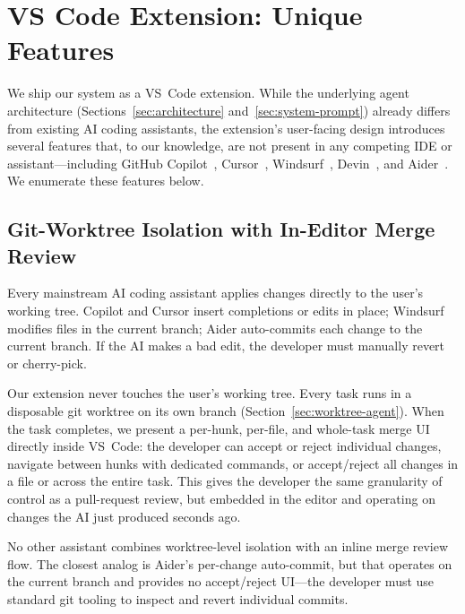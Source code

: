 \documentclass{article}
\begin{document}
\section{VS Code Extension: Unique Features}
\label{sec:vscode-features}

We ship our system as a VS~Code extension.  While
the underlying agent architecture (Sections~\ref{sec:architecture}
and~\ref{sec:system-prompt}) already differs from existing AI coding
assistants, the extension's user-facing design introduces several
features that, to our knowledge, are not present in any competing IDE
or assistant---including GitHub Copilot~\citep{copilot2021},
Cursor~\citep{cursor2024}, Windsurf~\citep{windsurf2024},
Devin~\citep{devin2024}, and Aider~\citep{aider2023}.  We enumerate
these features below.

\subsection{Git-Worktree Isolation with In-Editor Merge Review}
\label{sec:worktree-merge}

Every mainstream AI coding assistant applies changes directly to the
user's working tree.  Copilot and Cursor insert completions or edits
in place; Windsurf modifies files in the current branch; Aider
auto-commits each change to the current branch.  If the AI makes a
bad edit, the developer must manually revert or cherry-pick.

Our extension never touches the user's working tree.  Every task runs
in a disposable git worktree on its own branch
(Section~\ref{sec:worktree-agent}).  When the task completes, we
present a per-hunk, per-file, and whole-task merge UI directly inside
VS~Code: the developer can accept or reject individual changes,
navigate between hunks with dedicated commands, or accept/reject all
changes in a file or across the entire task.  This gives the developer
the same granularity of control as a pull-request review, but embedded
in the editor and operating on changes the AI just produced seconds
ago.

No other assistant combines worktree-level isolation with an
inline merge review flow.  The closest analog is Aider's per-change
auto-commit, but that operates on the current branch and provides no
accept/reject UI---the developer must use standard git tooling to
inspect and revert individual commits.
\end{document}
